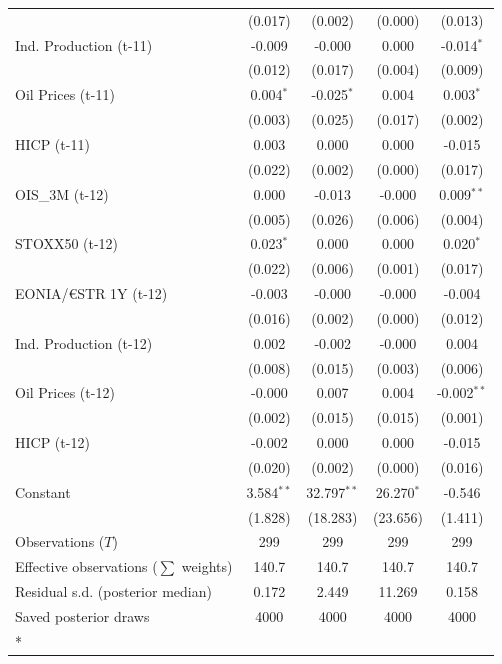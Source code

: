 \begin{longtable}[t]{lcccc}
 & (0.017) & (0.002) & (0.000) & (0.013)\\
Ind. Production (t-11) & -0.009 & -0.000 & 0.000 & -0.014$^{*}$\\
 & (0.012) & (0.017) & (0.004) & (0.009)\\
Oil Prices (t-11) & 0.004$^{*}$ & -0.025$^{*}$ & 0.004 & 0.003$^{*}$\\
 & (0.003) & (0.025) & (0.017) & (0.002)\\
HICP (t-11) & 0.003 & 0.000 & 0.000 & -0.015\\
 & (0.022) & (0.002) & (0.000) & (0.017)\\
OIS\_3M (t-12) & 0.000 & -0.013 & -0.000 & 0.009$^{**}$\\
 & (0.005) & (0.026) & (0.006) & (0.004)\\
STOXX50 (t-12) & 0.023$^{*}$ & 0.000 & 0.000 & 0.020$^{*}$\\
 & (0.022) & (0.006) & (0.001) & (0.017)\\
EONIA/€STR 1Y (t-12) & -0.003 & -0.000 & -0.000 & -0.004\\
 & (0.016) & (0.002) & (0.000) & (0.012)\\
Ind. Production (t-12) & 0.002 & -0.002 & -0.000 & 0.004\\
 & (0.008) & (0.015) & (0.003) & (0.006)\\
Oil Prices (t-12) & -0.000 & 0.007 & 0.004 & -0.002$^{**}$\\
 & (0.002) & (0.015) & (0.015) & (0.001)\\
HICP (t-12) & -0.002 & 0.000 & 0.000 & -0.015\\
 & (0.020) & (0.002) & (0.000) & (0.016)\\
Constant & 3.584$^{**}$ & 32.797$^{**}$ & 26.270$^{*}$ & -0.546\\
 & (1.828) & (18.283) & (23.656) & (1.411)\\
\midrule
Observations ($T$) & 299 & 299 & 299 & 299\\
Effective observations ($\sum$ weights) & 140.7 & 140.7 & 140.7 & 140.7\\
Residual s.d. (posterior median) & 0.172 & 2.449 & 11.269 & 0.158\\
Saved posterior draws & 4000 & 4000 & 4000 & 4000\\*
\end{longtable}
\endgroup{}

\begingroup\fontsize{7}{9}\selectfont

